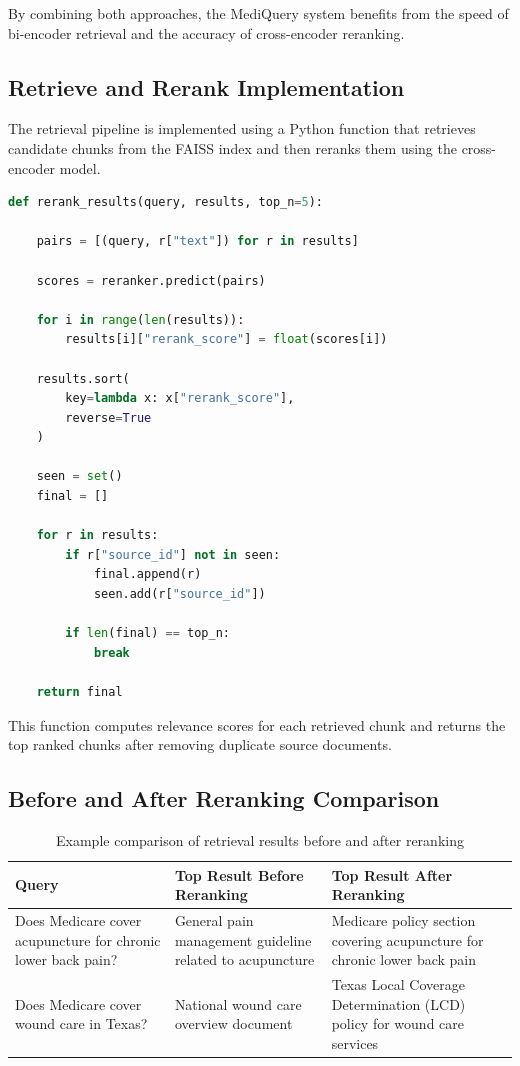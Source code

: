 \documentclass[12pt, letterpaper]{article}
\begin{document}
By combining both approaches, the MediQuery system benefits from the speed of bi-encoder retrieval and the accuracy of cross-encoder reranking.

\subsection{Retrieve and Rerank Implementation}

The retrieval pipeline is implemented using a Python function that retrieves candidate chunks from the FAISS index and then reranks them using the cross-encoder model.

\begin{lstlisting}[language=Python]
def rerank_results(query, results, top_n=5):

    pairs = [(query, r["text"]) for r in results]

    scores = reranker.predict(pairs)

    for i in range(len(results)):
        results[i]["rerank_score"] = float(scores[i])

    results.sort(
        key=lambda x: x["rerank_score"],
        reverse=True
    )

    seen = set()
    final = []

    for r in results:
        if r["source_id"] not in seen:
            final.append(r)
            seen.add(r["source_id"])

        if len(final) == top_n:
            break

    return final
\end{lstlisting}

This function computes relevance scores for each retrieved chunk and returns the top ranked chunks after removing duplicate source documents.

\subsection{Before and After Reranking Comparison}

\begin{table}[h]
\centering
\begin{tabular}{p{4cm} p{5cm} p{5cm}}
\toprule
\textbf{Query} & \textbf{Top Result Before Reranking} & \textbf{Top Result After Reranking} \\
\midrule
Does Medicare cover acupuncture for chronic lower back pain? &
General pain management guideline related to acupuncture &
Medicare policy section covering acupuncture for chronic lower back pain \\
\addlinespace
Does Medicare cover wound care in Texas? &
National wound care overview document &
Texas Local Coverage Determination (LCD) policy for wound care services \\
\bottomrule
\end{tabular}
\caption{Example comparison of retrieval results before and after reranking}
\end{table}
\end{document}
